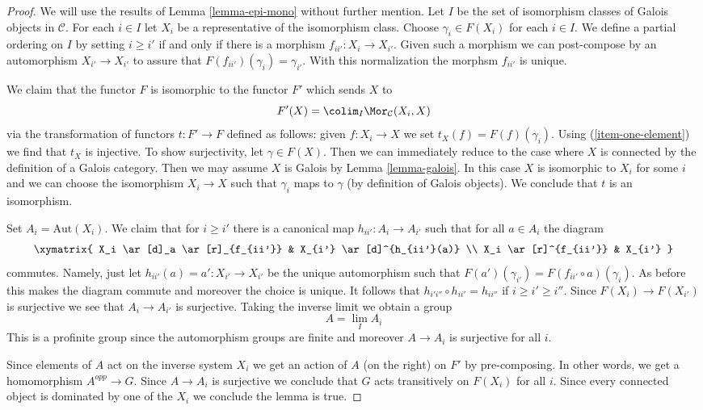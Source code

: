 \begin{proof}
We will use the results of Lemma \ref{lemma-epi-mono} without further mention.
Let $I$ be the set of isomorphism classes of Galois objects in $\mathcal{C}$.
For each $i \in I$ let $X_i$ be a representative of the isomorphism class.
Choose $\gamma_i \in F(X_i)$ for each $i \in I$.
We define a partial ordering on $I$ by setting $i \geq i'$ if
and only if there is a morphism $f_{ii'} : X_i \to X_{i'}$.
Given such a morphism we can post-compose by an automorphism
$X_{i'} \to X_{i'}$ to assure that $F(f_{ii'})(\gamma_i) = \gamma_{i'}$.
With this normalization the morphsm $f_{ii'}$ is unique.

\medskip\noindent
We claim that the functor $F$ is isomorphic to the functor $F'$
which sends $X$ to
$$
F'(X) = \colim_I \Mor_\mathcal{C}(X_i, X)
$$
via the transformation of functors $t : F' \to F$ defined as follows:
given $f : X_i \to X$ we set $t_X(f) = F(f)(\gamma_i)$.
Using (\ref{item-one-element}) we find that $t_X$ is injective.
To show surjectivity, let $\gamma \in F(X)$. Then we can immediately
reduce to the case where $X$ is connected by the definition of
a Galois category. Then we may assume $X$ is Galois by
Lemma \ref{lemma-galois}. In this case $X$ is isomorphic to $X_i$
for some $i$ and we can choose the isomorphism $X_i \to X$ such
that $\gamma_i$ maps to $\gamma$ (by definition of Galois objects).
We conclude that $t$ is an isomorphism.

\medskip\noindent
Set $A_i = \text{Aut}(X_i)$.
We claim that for $i \geq i'$ there is a canonical map
$h_{ii'} : A_i \to A_{i'}$ such that for all $a \in A_i$
the diagram
$$
\xymatrix{
X_i \ar[d]_a \ar[r]_{f_{ii'}} & X_{i'} \ar[d]^{h_{ii'}(a)} \\
X_i \ar[r]^{f_{ii'}} & X_{i'}
}
$$
commutes. Namely, just let $h_{ii'}(a) = a' : X_{i'} \to X_{i'}$
be the unique automorphism such that
$F(a')(\gamma_{i'}) = F(f_{ii'} \circ a)(\gamma_i)$.
As before this makes the diagram commute and moreover the choice
is unique.
It follows that
$h_{i'i''} \circ h_{ii'} = h_{ii''}$
if $i \geq i' \geq i''$.
Since $F(X_i) \to F(X_{i'})$ is surjective we see that
$A_i \to A_{i'}$ is surjective.
Taking the inverse limit we obtain a group
$$
A = \lim_I A_i
$$
This is a profinite group since the automorphism groups are finite
and moreover $A \to A_i$ is surjective for all $i$.

\medskip\noindent
Since elements of $A$ act on the inverse system $X_i$ we get an action of
$A$ (on the right) on $F'$ by pre-composing. In other words, we get
a homomorphism $A^{opp} \to G$. Since $A \to A_i$ is surjective we conclude
that $G$ acts transitively on $F(X_i)$ for all $i$. Since every connected
object is dominated by one of the $X_i$ we conclude the lemma is true.
\end{proof}

